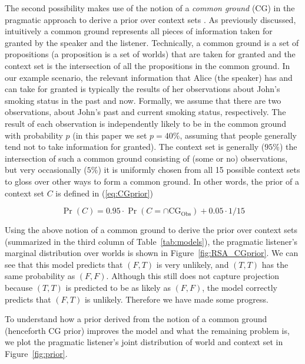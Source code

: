 
The second possibility makes use of the notion of a \emph{common ground} (CG) 
 in the pragmatic approach to derive a prior over context sets
 \cite{Stalnaker1974:Pragmatic-Presuppositions}.
As previously discussed, intuitively a common ground represents all pieces of
 information taken for granted by the speaker and the listener.
Technically, a common ground is a set of propositions (a proposition is a set of
  worlds) that are taken for granted and the context set is the intersection of all the propositions in the common ground.
In our example scenario, the relevant information that Alice (the speaker) has 
 and can take for granted is typically the results of her observations about John's smoking status in the past and now.
Formally, we assume that there are two observations, about John's past and current
 smoking status, respectively. 
The result of each observation is independently likely to be in the common ground
 with probability $p$ (in this paper we set $p=40\%$, assuming that people 
 generally tend not to take information for granted).
The context set is generally ($95\%$) the intersection of such a common ground
 consisting of (some or no) observations,
 but very occasionally ($5\%$) it is uniformly chosen from all 15 possible context 
 sets to gloss over other ways to form a common ground.
In other words, the prior of a context set $C$ is defined in (\ref{eq:CGprior})

\begin{equation}
\Pr(C)=0.95\cdot\Pr(C=\cap\text{CG}_\text{Obs})+0.05\cdot 1/15 \label{eq:CGprior}
\end{equation}

Using the above notion of a common ground to derive the prior over context sets
 (summarized in the third column of Table~\ref{tab:models}), the pragmatic
 listener's marginal distribution over worlds is shown in Figure~\ref{fig:RSA_CGprior}.
We can see that this model predicts that $(F, T)$ is very unlikely,
 and $(T, T)$ has the same probability as $(F, F)$. 
Although this still does not capture projection because $(T, T)$ is predicted to be
 as likely as $(F, F)$, the model correctly predicts that $(F, T)$ is unlikely. 
Therefore we have made some progress.

To understand how a prior derived from the notion of a common ground 
 (henceforth CG prior) improves the model and what the remaining problem is, 
 we plot the pragmatic listener's joint distribution of world and context set in
 Figure~\ref{fig:prior}. 

